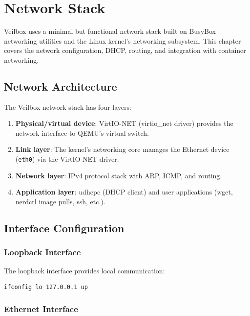 \chapter{Network Stack}
\label{ch:network}

Veilbox uses a minimal but functional network stack built on BusyBox
networking utilities and the Linux kernel's networking subsystem. This
chapter covers the network configuration, DHCP, routing, and integration
with container networking.

\section{Network Architecture}

The Veilbox network stack has four layers:

\begin{enumerate}[nosep]
  \item \textbf{Physical/virtual device}: VirtIO-NET (virtio\_net driver)
        provides the network interface to QEMU's virtual switch.
  \item \textbf{Link layer}: The kernel's networking core manages the
        Ethernet device (\texttt{eth0}) via the VirtIO-NET driver.
  \item \textbf{Network layer}: IPv4 protocol stack with ARP, ICMP, and
        routing.
  \item \textbf{Application layer}: udhcpc (DHCP client) and user
        applications (wget, nerdctl image pulls, ssh, etc.).
\end{enumerate}

\section{Interface Configuration}

\subsection{Loopback Interface}

The loopback interface provides local communication:

\begin{lstlisting}[language=bash]
ifconfig lo 127.0.0.1 up
\end{lstlisting}

\subsection{Ethernet Interface}

